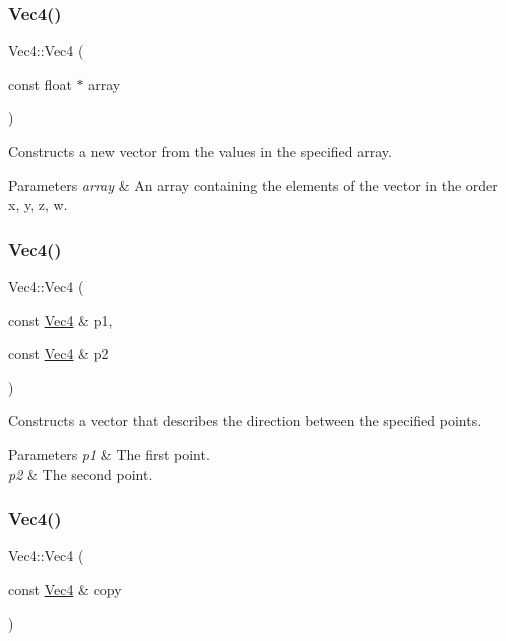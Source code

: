 \subsubsection{\texorpdfstring{Vec4()}{Vec4()}\hspace{0.1cm}{\footnotesize\ttfamily [8/10]}}
{\footnotesize\ttfamily Vec4\+::\+Vec4 (\begin{DoxyParamCaption}\item[{const float $\ast$}]{array }\end{DoxyParamCaption})}

Constructs a new vector from the values in the specified array.


\begin{DoxyParams}{Parameters}
{\em array} & An array containing the elements of the vector in the order x, y, z, w. \\
\hline
\end{DoxyParams}
\mbox{\label{classVec4_a91984373f7c3e83afcadf30ec5dad52a}} 
\subsubsection{\texorpdfstring{Vec4()}{Vec4()}\hspace{0.1cm}{\footnotesize\ttfamily [9/10]}}
{\footnotesize\ttfamily Vec4\+::\+Vec4 (\begin{DoxyParamCaption}\item[{const \hyperlink{classVec4}{Vec4} \&}]{p1,  }\item[{const \hyperlink{classVec4}{Vec4} \&}]{p2 }\end{DoxyParamCaption})}

Constructs a vector that describes the direction between the specified points.


\begin{DoxyParams}{Parameters}
{\em p1} & The first point. \\
\hline
{\em p2} & The second point. \\
\hline
\end{DoxyParams}
\mbox{\label{classVec4_acf7b803835459315b73f0cab3b5d392c}} 
\subsubsection{\texorpdfstring{Vec4()}{Vec4()}\hspace{0.1cm}{\footnotesize\ttfamily [10/10]}}
{\footnotesize\ttfamily Vec4\+::\+Vec4 (\begin{DoxyParamCaption}\item[{const \hyperlink{classVec4}{Vec4} \&}]{copy }\end{DoxyParamCaption})}

